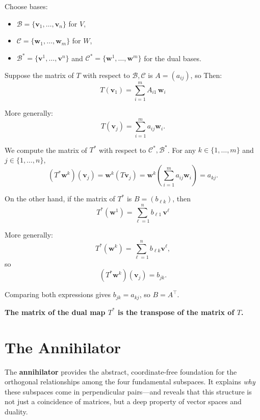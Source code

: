 \documentclass[11pt]{article}
\begin{document}
Choose bases:

\begin{itemize}
\item $ \mathcal{B} = \{ \mathbf{v}_1, \dots, \mathbf{v}_n \} $ for $ V $,
    \item $ \mathcal{C} = \{ \mathbf{w}_1, \dots, \mathbf{w}_m \} $ for $ W $,
    \item $ \mathcal{B}^* = \{ \mathbf{v}^1, \dots, \mathbf{v}^n \} $ and $ \mathcal{C}^* = \{ \mathbf{w}^1, \dots, \mathbf{w}^m \} $ for the dual bases.
\end{itemize}


Suppose the matrix of $ T $ with respect to $ \mathcal{B}, \mathcal{C} $ is $ A = (a_{ij})$, so
Then:
\[
T(\mathbf{v}_1) = \sum_{i=1}^{m} A_{i1} \, \mathbf{w}_i
\]

More generally:
\[
T(\mathbf{v}_j) = \sum_{i=1}^m a_{ij} \mathbf{w}_i.
\]

We compute the matrix of $ T^* $ with respect to $ \mathcal{C}^*, \mathcal{B}^* $.  
For any $ k \in \{1, \dots, m\} $ and $ j \in \{1, \dots, n\} $,
\[
(T^* \mathbf{w}^k)(\mathbf{v}_j) = \mathbf{w}^k(T \mathbf{v}_j) = \mathbf{w}^k\left( \sum_{i=1}^m a_{ij} \mathbf{w}_i \right) = a_{kj}.
\]

On the other hand, if the matrix of $ T^* $ is $ B = (b_{\ell k}) $, then
\[
\boxed{T^*(\mathbf{w}^1) = \sum_{\ell=1}^{n} b_{\ell 1} \, \mathbf{v}^\ell}
\]


More generally:
\[
T^*(\mathbf{w}^k) = \sum_{\ell=1}^n b_{\ell k} \mathbf{v}^\ell,
\]
so
\[
(T^* \mathbf{w}^k)(\mathbf{v}_j) = b_{j k}.
\]

Comparing both expressions gives $ b_{j k} = a_{k j} $, so $ B = A^\top $.

\begin{center}
\textbf{The matrix of the dual map $ T^* $ is the transpose of the matrix of $ T $.}
\end{center}













\section*{The Annihilator}

The \textbf{annihilator} provides the abstract, coordinate-free foundation for the orthogonal relationships among the four fundamental subspaces. It explains \textit{why} these subspaces come in perpendicular pairs—and reveals that this structure is not just a coincidence of matrices, but a deep property of vector spaces and duality.
\end{document}
